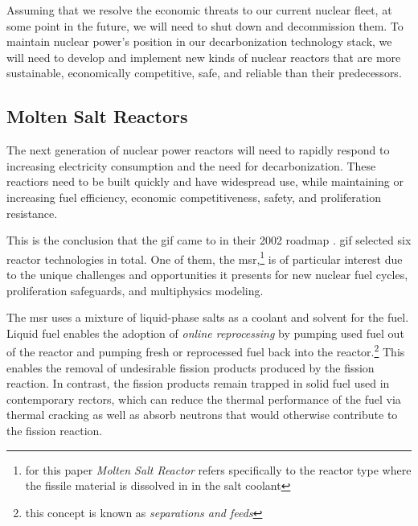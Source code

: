 \documentclass[letterpaper]{mc2023}
\begin{document}
Assuming that we resolve the economic threats to our current nuclear fleet,
at some point in the future, we will need to shut down and decommission them.
To maintain nuclear power's position in our decarbonization technology stack, we
will need to develop and implement new kinds of nuclear reactors that are more
sustainable, economically competitive, safe, and reliable than their
predecessors.
 
\subsection{Molten Salt Reactors}%
\label{sec:molten_salt_reactors}
The next generation of nuclear power reactors will need to rapidly respond to
increasing electricity consumption and the need for decarbonization. These
reactiors need to be built quickly and have widespread use, while maintaining or
increasing fuel efficiency, economic competitiveness, safety, and proliferation
resistance.

This is the conclusion that the \Gls{gif} came to in their 2002
roadmap \cite{doe-ne_technology_2002}. \Gls{gif} selected six reactor
technologies in total. One of them, the \Gls{msr},\footnote{for
this paper {\it Molten Salt Reactor} refers specifically to the reactor type
where the fissile material is dissolved in in the salt coolant} is of
particular interest due to the unique challenges and opportunities it presents
for new nuclear fuel cycles, proliferation safeguards, and multiphysics
modeling.

The \Gls{msr} uses a mixture of liquid-phase salts as a coolant and solvent for
the fuel. Liquid fuel enables the adoption of {\it online reprocessing} by
pumping used fuel out of the reactor and pumping fresh or reprocessed fuel back
into the reactor.\footnote{this concept is known as {\it separations and feeds}}
This enables the removal of undesirable fission products produced by the fission
reaction. In contrast, the fission
products remain trapped in solid fuel used in contemporary rectors, which can
reduce the thermal performance of the fuel via thermal cracking as well as
absorb neutrons that would otherwise contribute to the fission reaction. 

\end{document}
